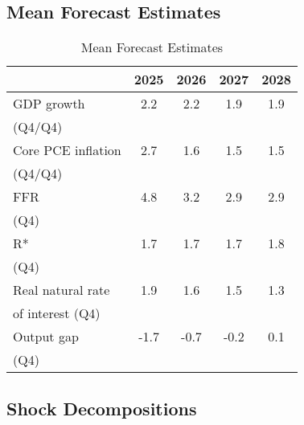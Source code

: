 \documentclass{article}
\begin{document}
\clearpage
\subsection{Mean Forecast Estimates}
\begin{table}[h!]
\centering
\begin{tabular}{l | c | c | c | c }
& 2025 & 2026 & 2027 & 2028 \\
\hline
\hline
GDP growth                        & 2.2 & 2.2 & 1.9 & 1.9 \\
(Q4/Q4)                           &     &     &     &     \\
\hline
Core PCE inflation                & 2.7 & 1.6 & 1.5 & 1.5 \\
(Q4/Q4)                           &     &     &     &     \\
\hline
FFR                               & 4.8 & 3.2 & 2.9 & 2.9 \\
(Q4)                              &     &     &     &     \\
\hline
R*                                & 1.7 & 1.7 & 1.7 & 1.8 \\
(Q4)                              &     &     &     &     \\
\hline
Real natural rate                 & 1.9 & 1.6 & 1.5 & 1.3 \\
of interest (Q4)                  &     &     &     &     \\
\hline
Output gap                        & -1.7 & -0.7 & -0.2 & 0.1 \\
(Q4)                              &     &     &     &     \\
\end{tabular}\caption{Mean Forecast Estimates}
\end{table}\clearpage
\subsection{Shock Decompositions}
\end{document}
